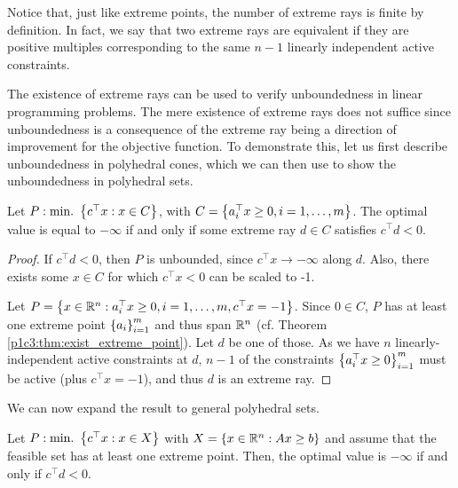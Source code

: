 Notice that, just like extreme points, the number of extreme rays is finite by definition. In fact, we say that two extreme rays are equivalent if they are positive multiples corresponding to the same $n-1$ linearly independent active constraints.


The existence of extreme rays can be used to verify unboundedness in linear programming problems. The mere existence of extreme rays does not suffice since unboundedness is a consequence of the extreme ray being a direction of improvement for the objective function. To demonstrate this, let us first describe unboundedness in polyhedral cones, which we can then use to show the unboundedness in polyhedral sets.

\begin{theorem}\label{p1c6:thm:unb_cones}
	Let $P : \mathop{\text{min.~}}\left\{ c^\top x : x \in C \right \}$, with $C = \left\{ a_i^\top x \geq 0, i = 1,\dots,m \right \}$. The optimal value is equal to $-\infty$ if and only if some extreme ray $d \in C$ satisfies $c^\top d < 0$.
\end{theorem}

\begin{proof}
	If $c^\top d < 0$, then $P$ is unbounded, since $c^\top x \rightarrow -\infty$ along $d$. Also, there exists some $x \in C$ for which $c^\top x < 0$ can be scaled to -1.
	
	Let $P = \left\{ x \in \mathbb{R}^n : a_i^\top x \geq 0, i =1,\dots,m , c^\top x = -1 \right \}$. Since $0 \in C$, $P$ has at least one extreme point $\left\{ a_i \right \}_{i=1}^m$ and thus span $\mathbb{R}^n$ (cf. Theorem \ref{p1c3:thm:exist_extreme_point}). Let $d$ be one of those. As we have $n$ linearly-independent active constraints at $d$, $n-1$ of the constraints $\left\{ a_i^\top x \geq 0 \right \}_{i =1}^m$ must be active (plus $c^\top x = -1$), and thus $d$ is an extreme ray.
\end{proof}

We can now expand the result to general polyhedral sets.

\begin{theorem}\label{p1c6:thm:unb_polyhedra} 
	Let $P : \mathop{\text{min.~}}\left\{ c^\top x : x \in X \right \}$ with $X = \left\{ x \in \mathbb{R}^n : Ax \geq b \right \}$ and assume that the feasible set has at least one extreme point. Then, the optimal value is $-\infty$ if and only if $c^\top d < 0$.  	
\end{theorem}

